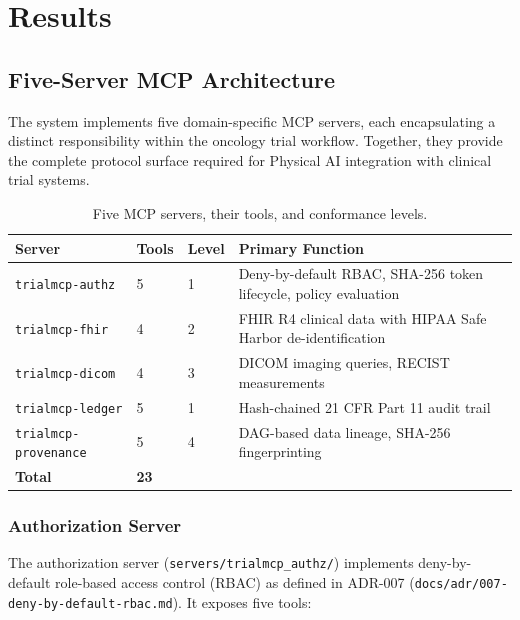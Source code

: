 \documentclass{article}
\begin{document}
\section{Results}
\label{sec:results}

\subsection{Five-Server MCP Architecture}

The system implements five domain-specific MCP servers, each encapsulating a distinct responsibility within the oncology trial workflow. Together, they provide the complete protocol surface required for Physical AI integration with clinical trial systems.

\begin{table}[H]
\centering
\caption{Five MCP servers, their tools, and conformance levels.}
\label{tab:five-servers}
\small
\begin{tabularx}{\textwidth}{@{}L{2.4cm}C{0.8cm}C{1.2cm}L{7.5cm}@{}}
\toprule
\textbf{Server} & \textbf{Tools} & \textbf{Level} & \textbf{Primary Function} \\
\midrule
\texttt{trialmcp-authz} & 5 & 1 & Deny-by-default RBAC, SHA-256 token lifecycle, policy evaluation \\
\texttt{trialmcp-fhir} & 4 & 2 & FHIR R4 clinical data with HIPAA Safe Harbor de-identification \\
\texttt{trialmcp-dicom} & 4 & 3 & DICOM imaging queries, RECIST~\cite{eisenhauer2009recist} measurements \\
\texttt{trialmcp-ledger} & 5 & 1 & Hash-chained 21 CFR Part 11 audit trail \\
\texttt{trialmcp-provenance} & 5 & 4 & DAG-based data lineage, SHA-256 fingerprinting \\
\midrule
\textbf{Total} & \textbf{23} & & \\
\bottomrule
\end{tabularx}
\end{table}

\subsubsection{Authorization Server}

The authorization server (\texttt{servers/trialmcp\_authz/}) implements deny-by-default role-based access control (RBAC) as defined in ADR-007 (\texttt{docs/adr/007-deny-by-default-rbac.md}). It exposes five tools:
\end{document}

